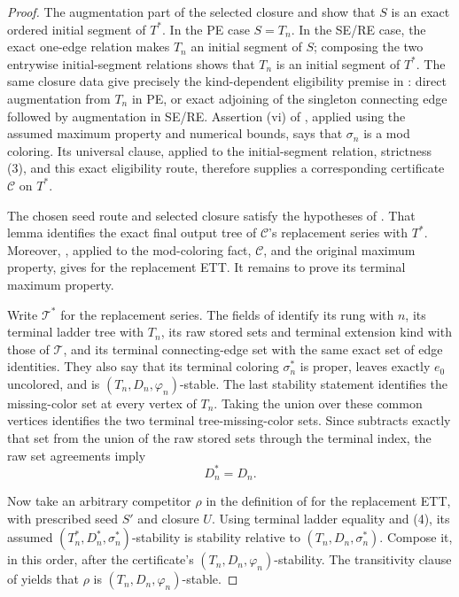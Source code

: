\begin{proof}
The augmentation part of the selected closure and
 show that \(S\) is
an exact ordered initial segment of \(T^*\).  In the PE case \(S=T_n\).
In the SE/RE case, the exact one-edge relation makes \(T_n\) an initial
segment of \(S\); composing the two entrywise initial-segment relations
shows that \(T_n\) is an initial segment of \(T^*\).  The same closure
data give precisely the kind-dependent eligibility premise in
: direct augmentation from \(T_n\) in PE, or exact
adjoining of the singleton connecting edge followed by augmentation in
SE/RE.  Assertion (vi) of , applied using
the assumed maximum property and numerical bounds, says that
\(\sigma_n\) is a mod coloring.  Its universal clause, applied to the
initial-segment relation, strictness (3), and this exact eligibility route,
therefore supplies a corresponding certificate \(\mathcal C\) on
\(T^*\).

The chosen seed route and selected closure satisfy the hypotheses of
.  That lemma identifies the
exact final output tree of \(\mathcal C\)'s replacement series with
\(T^*\).  Moreover, , applied to the
mod-coloring fact, \(\mathcal C\), and the original maximum property,
gives  for the replacement ETT.  It remains to
prove its terminal maximum property.

Write \(\mathcal T^*\) for the replacement series.  The fields of
 identify its rung with
\(n\), its terminal ladder tree with \(T_n\), its raw stored sets and
terminal extension kind with those of \(\mathcal T\), and its terminal
connecting-edge set with the same exact set of edge identities.  They
also say that its terminal coloring \(\sigma_n^*\) is proper, leaves
exactly \(e_0\) uncolored, and is
\((T_n,D_n,\varphi_n)\)-stable.  The last stability statement identifies
the missing-color set at every vertex of \(T_n\).  Taking the union over
these common vertices identifies the two terminal tree-missing-color
sets.  Since  subtracts exactly that set
from the union of the raw stored sets through the terminal index, the raw
set agreements imply
\[
 D_n^*=D_n.                                                     \tag{4}
\]

Now take an arbitrary competitor \(\rho\) in the definition of
 for the replacement ETT, with prescribed
seed \(S'\) and closure \(U\).  Using terminal ladder equality and (4),
its assumed \((T_n^*,D_n^*,\sigma_n^*)\)-stability is stability relative
to \((T_n,D_n,\sigma_n^*)\).  Compose it, in this order, after the
certificate's \((T_n,D_n,\varphi_n)\)-stability.  The transitivity clause
of  yields that \(\rho\) is
\((T_n,D_n,\varphi_n)\)-stable.                                


\end{proof}
